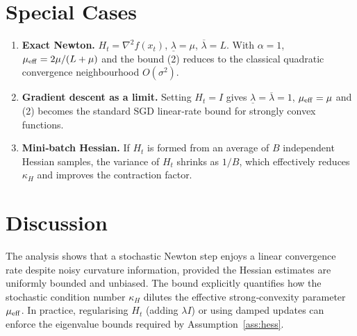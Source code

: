 \documentclass{article}
\begin{document}
\section*{Special Cases}
\begin{enumerate}[label={\roman*.}, leftmargin=*]
\item \textbf{Exact Newton.}  $H_{t}=\nabla^{2}f(x_{t})$,
    $\underline{\lambda}=\mu$, $\overline{\lambda}=L$.  
    With $\alpha=1$, $\mu_{\rm eff}=2\mu/(L+\mu)$ and the bound (2) reduces to the
    classical quadratic convergence neighbourhood $O(\sigma^{2})$.
\item \textbf{Gradient descent as a limit.}
    Setting $H_{t}=I$ gives $\underline{\lambda}=\overline{\lambda}=1$,
    $\mu_{\rm eff}= \mu$ and (2) becomes the standard SGD linear‑rate bound
    for strongly convex functions.
\item \textbf{Mini‑batch Hessian.}
    If $H_{t}$ is formed from an average of $B$ independent Hessian samples,
    the variance of $H_{t}$ shrinks as $1/B$, which effectively reduces
    $\kappa_{H}$ and improves the contraction factor.
\end{enumerate}

\section*{Discussion}
The analysis shows that a stochastic Newton step enjoys a linear convergence
rate despite noisy curvature information, provided the Hessian estimates are
uniformly bounded and unbiased.  The bound explicitly quantifies how the
stochastic condition number $\kappa_{H}$ dilutes the effective strong‑convexity
parameter $\mu_{\rm eff}$.  In practice, regularising $H_{t}$ (adding $\lambda I$)
or using damped updates can enforce the eigenvalue bounds required by
Assumption~\ref{ass:hess}.
\end{document}
